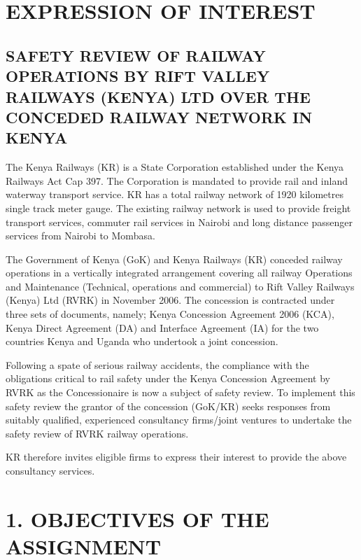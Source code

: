 \section{EXPRESSION OF INTEREST}\label{expression-of-interest}

\subsection{SAFETY REVIEW OF RAILWAY OPERATIONS BY RIFT VALLEY RAILWAYS
	(KENYA) LTD OVER THE CONCEDED RAILWAY NETWORK IN
	KENYA}\label{safety-review-of-railway-operations-by-rift-valley-railways-kenya-ltd-over-the-conceded-railway-network-in-kenya}

The Kenya Railways (KR) is a State Corporation established under the
Kenya Railways Act Cap 397. The Corporation is mandated to provide rail
and inland waterway transport service. KR has a total railway network of
1920 kilometres single track meter gauge. The existing railway network
is used to provide freight transport services, commuter rail services in
Nairobi and long distance passenger services from Nairobi to Mombasa.

The Government of Kenya (GoK) and Kenya Railways (KR) conceded railway
operations in a vertically integrated arrangement covering all railway
Operations and Maintenance (Technical, operations and commercial) to
Rift Valley Railways (Kenya) Ltd (RVRK) in November 2006. The concession
is contracted under three sets of documents, namely; Kenya Concession
Agreement 2006 (KCA), Kenya Direct Agreement (DA) and Interface
Agreement (IA) for the two countries Kenya and Uganda who undertook a
joint concession.

Following a spate of serious railway accidents, the compliance with the
obligations critical to rail safety under the Kenya Concession Agreement
by RVRK as the Concessionaire is now a subject of safety review. To
implement this safety review the grantor of the concession (GoK/KR)
seeks responses from suitably qualified, experienced consultancy
firms/joint ventures to undertake the safety review of RVRK railway
operations.

KR therefore invites eligible firms to express their interest to provide
the above consultancy services.

\section{1. OBJECTIVES OF THE
	ASSIGNMENT}\label{objectives-of-the-assignment}

